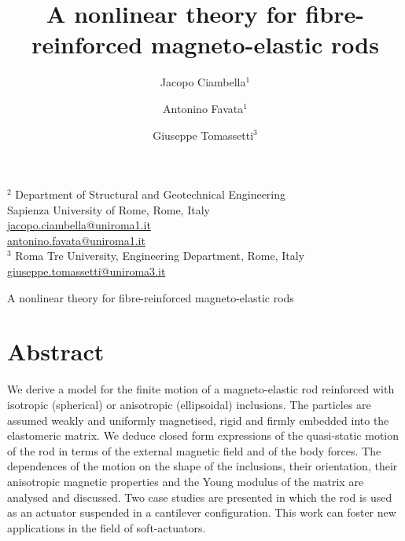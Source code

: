 \documentclass[oneside]{article}
\begin{document}
	


\title{\vspace{-3cm} {\bf  A  nonlinear  theory  for  fibre-reinforced  magneto-elastic rods}}



\author{
Jacopo Ciambella$^1$\!\!\!\!\! \and  Antonino Favata$^1$\!\!\!\!\! \and Giuseppe Tomassetti$^{3}$
}


%

\maketitle

\vspace{-1cm}
\begin{center}
	{\small
		
		$^2$ Department of Structural and Geotechnical Engineering\\
		Sapienza University of Rome, Rome, Italy\\
		\href{mailto:jacopo.ciambella@uniroma1.it}{jacopo.ciambella@uniroma1.it}\\[8pt]
		\href{mailto:antonino.favata@uniroma1.it}{antonino.favata@uniroma1.it}\\[8pt]
		
		$^3$ Roma Tre University, Engineering Department, Rome, Italy
		\href{mailto:giuseppe.tomassetti@uniroma3.it}{giuseppe.tomassetti@uniroma3.it}
	}
\end{center}



\pagestyle{myheadings}
{A  nonlinear  theory  for  fibre-reinforced  magneto-elastic rods}

\vspace{-0.5cm}
\section*{Abstract}

We derive a  model for the finite motion of a magneto-elastic rod reinforced with isotropic (spherical) or anisotropic (ellipsoidal) inclusions. The particles are assumed weakly and uniformly magnetised, rigid and firmly embedded into the elastomeric matrix.
We deduce closed form expressions of the quasi-static motion of the rod in terms of the external magnetic field and of the body forces. The dependences of the motion on the shape of the inclusions, their orientation, their anisotropic magnetic properties and the Young modulus of the matrix are analysed and discussed. Two case studies are presented in which the rod is used as an actuator suspended in a cantilever configuration. This work can foster new applications in the field of soft-actuators.
\end{document}
